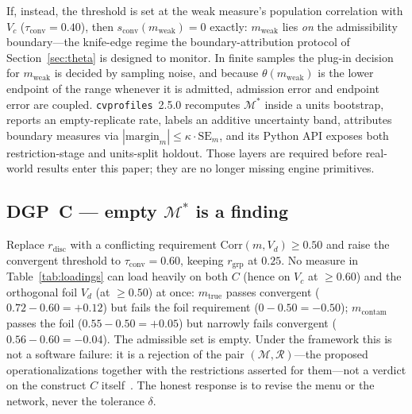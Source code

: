 \documentclass[10pt,letterpaper]{article}
\newcommand{\cvp}{\texttt{cvprofiles}}
\newcommand{\M}{\ensuremath{\mathcal{M}}}
\newcommand{\Rset}{\mathcal{R}}
\begin{document}
If, instead, the threshold is set at the weak measure's population correlation with $V_{\!c}$ ($\tau_{\mathrm{conv}}=0.40$), then $s_{\mathrm{conv}}(m_{\mathrm{weak}})=0$ exactly: $m_{\mathrm{weak}}$ lies \emph{on} the admissibility boundary---the knife-edge regime the boundary-attribution protocol of Section~\ref{sec:theta} is designed to monitor.
In finite samples the plug-in decision for $m_{\mathrm{weak}}$ is decided by sampling noise, and because $\theta(m_{\mathrm{weak}})$ is the lower endpoint of the range whenever it is admitted, admission error and endpoint error are coupled.
\cvp{}~2.5.0 recomputes $\M^*$ inside a units bootstrap, reports an empty-replicate rate, labels an additive uncertainty band, attributes boundary measures via $|\mathrm{margin}_m|\le\kappa\cdot\mathrm{SE}_m$, and its Python API exposes both restriction-stage and units-split holdout.
Those layers are required before real-world results enter this paper; they are no longer missing engine primitives.

\subsection{DGP~C --- empty $\M^*$ is a finding}
Replace $r_{\mathrm{disc}}$ with a conflicting requirement $\mathrm{Corr}(m,V_{\!d})\ge 0.50$ and raise the convergent threshold to $\tau_{\mathrm{conv}}=0.60$, keeping $r_{\mathrm{grp}}$ at $0.25$.
No measure in Table~\ref{tab:loadings} can load heavily on both $C$ (hence on $V_{\!c}$ at $\ge 0.60$) and the orthogonal foil $V_{\!d}$ (at $\ge 0.50$) at once: $m_{\mathrm{true}}$ passes convergent ($0.72-0.60=+0.12$) but fails the foil requirement ($0-0.50=-0.50$); $m_{\mathrm{contam}}$ passes the foil ($0.55-0.50=+0.05$) but narrowly fails convergent ($0.56-0.60=-0.04$).
The admissible set is empty.
Under the framework this is not a software failure: it is a rejection of the pair $(\M,\Rset)$---the proposed operationalizations together with the restrictions asserted for them---not a verdict on the construct $C$ itself~\cite{cvprofiles}.
The honest response is to revise the menu or the network, never the tolerance $\delta$.
\end{document}

